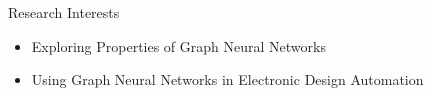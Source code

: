 
\begin{rSection}{Research Interests}
\begin{itemize}
    \item Exploring Properties of Graph Neural Networks
    \item Using Graph Neural Networks in Electronic Design Automation
\end{itemize}
\end{rSection}




